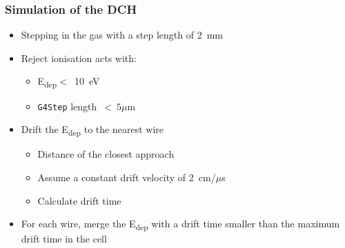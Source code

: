 \documentclass[hyperref={colorlinks=true,pdfpagelabels=false,linkcolor=black}, xcolor=dvipsnames,10pt]{beamer}
\begin{document}
\begin{frame}
	\frametitle{Simulation of the DCH}
	
	\begin{itemize}
	\item Stepping in the gas with a step length of 2~mm \vspace{0.2cm}
	\item Reject ionisation acts with: \vspace{0.2cm}
		\begin{itemize}
		\item E\textsubscript{dep}$<$~10~eV
		\item \texttt{G4Step} length~$<~5\mu$m
		\end{itemize} \vspace{0.2cm}
	
	\item Drift the E\textsubscript{dep} to the nearest wire \vspace{0.2cm}
		\begin{itemize}
		\item Distance of the closest approach
		\item Assume a constant drift velocity of 2~cm/$\mu$s
		\item Calculate drift time
		\end{itemize} \vspace{0.2cm}
		
	\item For each wire, merge the E\textsubscript{dep} with a drift time smaller than the maximum drift time in the cell
	\end{itemize}
	
\end{frame}
\end{document}
